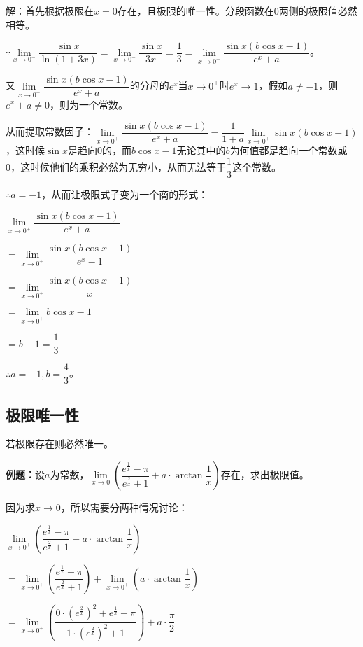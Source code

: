 \documentclass[UTF8, 12pt]{ctexart}
\begin{document}
解：首先根据极限在$x=0$存在，且极限的唯一性。分段函数在0两侧的极限值必然相等。

$\because\lim\limits_{x\to 0^-}\dfrac{\sin x}{\ln(1+3x)}=\lim\limits_{x\to 0^-}\dfrac{\sin x}{3x}=\dfrac{1}{3}=\lim\limits_{x\to 0^+}\dfrac{\sin x(b\cos x-1)}{e^x+a}$。

\medskip

又$\lim\limits_{x\to 0^+}\dfrac{\sin x(b\cos x-1)}{e^x+a}$的分母的$e^x$当$x\to 0^+$时$e^x\to 1$，假如$a\neq-1$，则$e^x+a\neq 0$，则为一个常数。

从而提取常数因子：$\lim\limits_{x\to 0^+}\dfrac{\sin x(b\cos x-1)}{e^x+a}=\dfrac{1}{1+a}\lim\limits_{x\to 0^+}\sin x(b\cos x-1)$，这时候$\sin x$是趋向0的，而$b\cos x-1$无论其中的$b$为何值都是趋向一个常数或0，这时候他们的乘积必然为无穷小，从而无法等于$\dfrac{1}{3}$这个常数。

$\therefore a=-1$，从而让极限式子变为一个商的形式：\medskip

$\lim\limits_{x\to 0^+}\dfrac{\sin x(b\cos x-1)}{e^x+a}$\medskip

$=\lim\limits_{x\to 0^+}\dfrac{\sin x(b\cos x-1)}{e^x-1}$\medskip

$=\lim\limits_{x\to 0^+}\dfrac{\sin x(b\cos x-1)}{x}$\medskip

$=\lim\limits_{x\to 0^+}b\cos x-1$\medskip

$=b-1=\dfrac{1}{3}$\medskip

$\therefore a=-1,b=\dfrac{4}{3}$。

\subsection{极限唯一性}

若极限存在则必然唯一。

\textbf{例题：}设$a$为常数，$\lim\limits_{x\to 0}\left(\dfrac{e^{\frac{1}{x}}-\pi}{e^{\frac{2}{x}}+1}+a\cdot\arctan\dfrac{1}{x}\right)$存在，求出极限值。

因为求$x\to 0$，所以需要分两种情况讨论：

\medskip

$\lim\limits_{x\to 0^+}\left(\dfrac{e^{\frac{1}{x}}-\pi}{e^{\frac{2}{x}}+1}+a\cdot\arctan\dfrac{1}{x}\right)$

$= \lim\limits_{x\to 0^+}\left(\dfrac{e^{\frac{1}{x}}-\pi}{e^{\frac{2}{x}}+1}\right)+\lim\limits_{x\to 0^+}\left(a\cdot\arctan\dfrac{1}{x}\right)$

$= \lim\limits_{x\to 0^+}\left(\dfrac{0\cdot\left(e^{\frac{2}{x}}\right)^2+e^{\frac{1}{x}}-\pi}{1\cdot\left(e^{\frac{2}{x}}\right)^2+1}\right)+a\cdot\dfrac{\pi}{2}$
\end{document}
